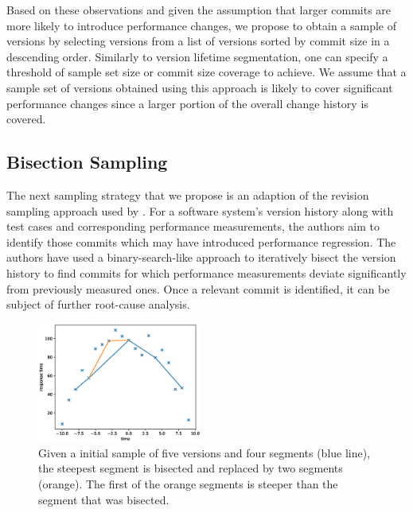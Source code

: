 Based on these observations and given the assumption that larger commits are
more likely to introduce performance changes, we propose to obtain a sample of
versions by selecting versions from a list of versions sorted by commit size in
a descending order. Similarly to version lifetime segmentation, one can specify
a threshold of sample set size or commit size coverage to achieve. We assume
that a sample set of versions obtained using this approach is likely to cover
significant performance changes since a larger portion of the overall change
history is covered.


\subsection{Bisection Sampling}
The next sampling strategy that we propose is an adaption of the revision
sampling approach used by \cite{heger_automated_2013}. For a software system’s
 version history along with test cases and corresponding performance
 measurements, the
authors aim to identify those commits which may have introduced performance
regression. The authors have used a binary-search-like approach to iteratively
bisect the version history to find commits for which performance measurements
deviate significantly from previously measured ones. Once a relevant commit is
identified, it can be subject of further root-cause analysis.

\begin{figure}
 \begin{center}
   \vspace{-1cm}
   \includegraphics[width=0.48\textwidth]{images/inverse_douglas_peucker}
 \end{center}
 \caption{Given a initial sample of five versions and four segments (blue
 line), the steepest segment is bisected and replaced by two segments
 (orange).
The first of the orange segments is steeper than the segment that was
bisected. \label{fig:example_bisection}}
\end{figure}

